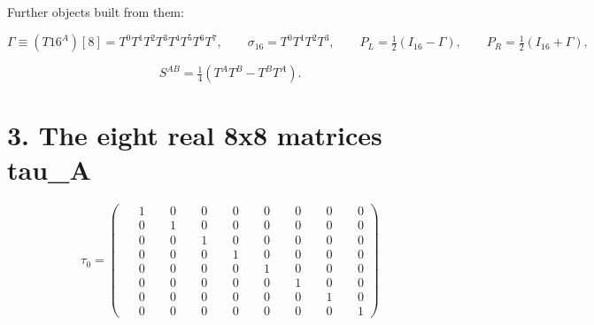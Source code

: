 \documentclass[10pt]{article}
\makeatletter
\newcommand\keepnext{\par\nopagebreak\@nobreaktrue\everypar{\@nobreakfalse\everypar{}}}
\makeatother
\begin{document}
Further objects built from them:\keepnext


\[
\Gamma \equiv (T16^A)[8] = T^0T^1T^2T^3T^4T^5T^6T^7, \qquad \sigma_{16} = T^0T^1T^2T^3, \qquad P_L = \tfrac12(I_{16}-\Gamma), \qquad P_R = \tfrac12(I_{16}+\Gamma),
\]

\[
S^{AB} = \tfrac14\left(T^A T^B - T^B T^A\right).
\]

\section*{3. The eight real 8x8 matrices tau\_A}

\[
\tau_{0} = \left(\begin{smallmatrix}
\phantom{-}1 & \phantom{-}0 & \phantom{-}0 & \phantom{-}0 & \phantom{-}0 & \phantom{-}0 & \phantom{-}0 & \phantom{-}0 \\
\phantom{-}0 & \phantom{-}1 & \phantom{-}0 & \phantom{-}0 & \phantom{-}0 & \phantom{-}0 & \phantom{-}0 & \phantom{-}0 \\
\phantom{-}0 & \phantom{-}0 & \phantom{-}1 & \phantom{-}0 & \phantom{-}0 & \phantom{-}0 & \phantom{-}0 & \phantom{-}0 \\
\phantom{-}0 & \phantom{-}0 & \phantom{-}0 & \phantom{-}1 & \phantom{-}0 & \phantom{-}0 & \phantom{-}0 & \phantom{-}0 \\
\phantom{-}0 & \phantom{-}0 & \phantom{-}0 & \phantom{-}0 & \phantom{-}1 & \phantom{-}0 & \phantom{-}0 & \phantom{-}0 \\
\phantom{-}0 & \phantom{-}0 & \phantom{-}0 & \phantom{-}0 & \phantom{-}0 & \phantom{-}1 & \phantom{-}0 & \phantom{-}0 \\
\phantom{-}0 & \phantom{-}0 & \phantom{-}0 & \phantom{-}0 & \phantom{-}0 & \phantom{-}0 & \phantom{-}1 & \phantom{-}0 \\
\phantom{-}0 & \phantom{-}0 & \phantom{-}0 & \phantom{-}0 & \phantom{-}0 & \phantom{-}0 & \phantom{-}0 & \phantom{-}1
\end{smallmatrix}\right)
\]
\end{document}
